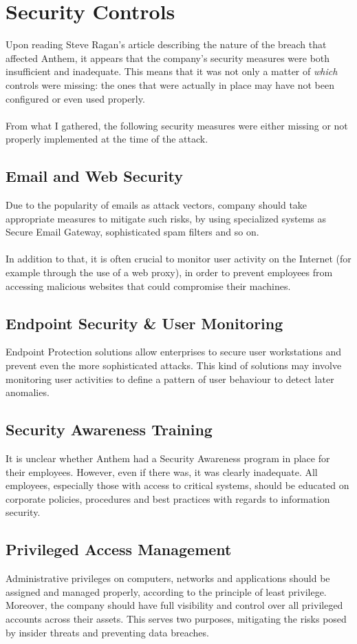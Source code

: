 \section{Security Controls}
	Upon reading Steve Ragan's article \cite{breacharticle} describing the nature of the breach that affected Anthem, it appears that the company's security measures were both insufficient and inadequate. This means that it was not only a matter of \textit{which} controls were missing: the ones that were actually in place may have not been configured or even used properly.\\\\
	From what I gathered, the following security measures were either missing or not properly implemented at the time of the attack. 
	\subsection{Email and Web Security}
	Due to the popularity of emails as attack vectors, company should take appropriate measures to mitigate such risks, by using specialized systems as Secure Email Gateway, sophisticated spam filters and so on.\\\\In addition to that, it is often crucial to monitor user activity on the Internet (for example through the use of a web proxy), in order to prevent employees from accessing malicious websites that could compromise their machines.
	\subsection{Endpoint Security \& User Monitoring}
	Endpoint Protection solutions allow enterprises to secure user workstations and prevent even the more sophisticated attacks. This kind of solutions may involve monitoring user activities to define a pattern of user behaviour to detect later anomalies.
	\subsection{Security Awareness Training}
	It is unclear whether Anthem had a Security Awareness program in place for their employees. However, even if there was, it was clearly inadequate. All employees, especially those with access to critical systems, should be educated on corporate policies, procedures and best practices with regards to information security.
	\subsection{Privileged Access Management}
	Administrative privileges on computers, networks and applications should be assigned and managed properly, according to the principle of least privilege. Moreover, the company should have full visibility and control over all privileged accounts across their assets. This serves two purposes, mitigating the risks posed by insider threats and preventing data breaches.
